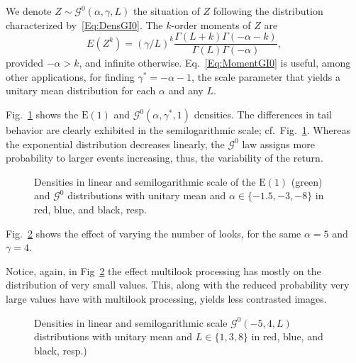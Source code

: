 We denote $Z\sim \mathcal G^0(\alpha,\gamma,L)$ the situation of $Z$ following the distribution characterized by~\eqref{Eq:DensGI0}.
The $k$-order moments of $Z$ are
\begin{equation}
E(Z^k) = (\gamma / L)^{k} \frac{\Gamma(L+k)\Gamma(-\alpha-k)}{\Gamma(L)\Gamma(-\alpha)},
\label{Eq:MomentGI0}
\end{equation}
provided $-\alpha>k$, and infinite otherwise.
Eq.~\eqref{Eq:MomentGI0} is useful, among other applications, for finding $\gamma^*=-\alpha-1$, the scale parameter that yields a unitary mean distribution for each $\alpha$ and any $L$.

Fig.~\ref{Fig:GI0Distribution} shows the $\text{E}(1)$ and $\mathcal G^0(\alpha,\gamma^*, 1)$ densities.
The differences in tail behavior are clearly exhibited in the semilogarithmic scale; cf.\ Fig.~\ref{Fig:GI0Distribution}.
Whereas the exponential distribution decreases linearly, the $\mathcal G^0$ law assigns more probability to larger events increasing, thus, the variability of the return.

\begin{figure}[hbt]
\centering
{}
\caption[Densities in linear and semilogarithmic scale of the $\text{E}(1)$ (green) and $\mathcal G^0$ distributions with unitary mean]{Densities in linear and semilogarithmic scale of the $\text{E}(1)$ (green) and $\mathcal G^0$ distributions with unitary mean and $\alpha\in\{-1.5,-3,-8\}$ in red, blue, and black, resp.}\label{Fig:GI0Distribution}
\end{figure}

Fig.~\ref{Fig:GI0DistributionLooks} shows the effect of varying the number of looks, for the same $\alpha=5$ and $\gamma=4$.

Notice, again, in Fig~\ref{Fig:GI0DistributionLooks} the effect multilook processing has mostly on the distribution of very small values.
This, along with the reduced probability very large values have with multilook processing, yields less contrasted images.

\begin{figure}[hbt]
\centering
{}
\caption[Densities in linear and semilogarithmic scale $\mathcal G^0(-5,4,L)$ distributions with unitary mean and $L\in\{1,3,8\}$]{Densities in linear and semilogarithmic scale $\mathcal G^0(-5,4,L)$ distributions with unitary mean and $L\in\{1,3,8\}$ in red, blue, and black, resp.)}\label{Fig:GI0DistributionLooks}
\end{figure}

